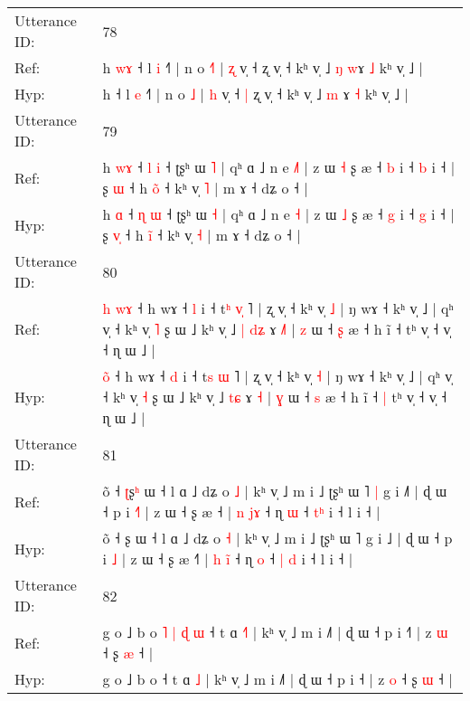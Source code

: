 \documentclass[10pt]{article}
\DeclareRobustCommand{\hl}[1]{{\textcolor{red}{#1}}}
\begin{document}
\begin{longtable}{ll}
 \\
\midrule
Utterance ID: & 78 \\
Ref: & h\hl{ }\hl{w}\hl{ɤ} ˧ l \hl{i} ˧˥ | n o \hl{˧}\hl{˥} | \hl{ʐ} v̩ ˧\hl{}\hl{} ʐ v̩ ˧ kʰ v̩ ˩ \hl{ŋ} \hl{w}ɤ \hl{˩} kʰ v̩ ˩ |
 \\
Hyp: & h\hl{}\hl{}\hl{} ˧ l \hl{e} ˧˥ | n o \hl{}\hl{˩} | \hl{h} v̩ ˧\hl{ }\hl{|} ʐ v̩ ˧ kʰ v̩ ˩ \hl{m} \hl{}ɤ \hl{˧} kʰ v̩ ˩ |
 \\
\midrule
Utterance ID: & 79 \\
Ref: & h \hl{w}\hl{ɤ} ˧ \hl{l} \hl{i} ˧ ʈʂʰ ɯ \hl{˥} | qʰ ɑ ˩ n e \hl{˩}\hl{˥} | z ɯ \hl{˧} ʂ æ ˧ \hl{b} i ˧ \hl{b} i ˧ | ʂ \hl{}\hl{ɯ} ˧ h \hl{o}̃ ˧ kʰ v̩ \hl{˥} | m ɤ ˧ dʑ o ˧ |
 \\
Hyp: & h \hl{}\hl{ɑ} ˧ \hl{ɳ} \hl{ɯ} ˧ ʈʂʰ ɯ \hl{˧} | qʰ ɑ ˩ n e \hl{}\hl{˧} | z ɯ \hl{˩} ʂ æ ˧ \hl{g} i ˧ \hl{g} i ˧ | ʂ \hl{v}\hl{̩} ˧ h \hl{i}̃ ˧ kʰ v̩ \hl{˧} | m ɤ ˧ dʑ o ˧ |
 \\
\midrule
Utterance ID: & 80 \\
Ref: & \hl{h}\hl{ }\hl{w}\hl{ɤ} ˧ h wɤ ˧ \hl{l} i ˧ t\hl{ʰ} \hl{v}\hl{̩} ˥ | ʐ v̩ ˧ kʰ v̩ \hl{˩} | ŋ wɤ ˧ kʰ v̩ ˩ | qʰ v̩ ˧ kʰ v̩ \hl{˥} ʂ ɯ ˩ kʰ v̩ ˩\hl{ }\hl{|} \hl{d}\hl{ʑ} ɤ \hl{˩}\hl{˥} | \hl{z} ɯ ˧ \hl{ʂ} æ ˧ h ĩ ˧\hl{}\hl{} tʰ v̩ ˧ v̩ ˧ ɳ ɯ ˩ |
 \\
Hyp: & \hl{}\hl{}\hl{o}\hl{̃} ˧ h wɤ ˧ \hl{d} i ˧ t\hl{s} \hl{}\hl{ɯ} ˥ | ʐ v̩ ˧ kʰ v̩ \hl{˧} | ŋ wɤ ˧ kʰ v̩ ˩ | qʰ v̩ ˧ kʰ v̩ \hl{˧} ʂ ɯ ˩ kʰ v̩ ˩\hl{}\hl{} \hl{t}\hl{ɕ} ɤ \hl{}\hl{˧} | \hl{ɣ} ɯ ˧ \hl{s} æ ˧ h ĩ ˧\hl{ }\hl{|} tʰ v̩ ˧ v̩ ˧ ɳ ɯ ˩ |
 \\
\midrule
Utterance ID: & 81 \\
Ref: & õ ˧ \hl{ʈ}ʂ\hl{ʰ} ɯ ˧ l ɑ ˩ dʑ o \hl{˩} | kʰ v̩ ˩ m i ˩ ʈʂʰ ɯ ˥\hl{ }\hl{|} g i ˩\hl{˥} | ɖ ɯ ˧ p i \hl{˧}\hl{˥} | z ɯ ˧ ʂ æ ˧\hl{} | \hl{n} \hl{j}\hl{ɤ} ˧ ɳ \hl{ɯ} ˧ \hl{}\hl{t}\hl{ʰ} i ˧ l i ˧ |
 \\
Hyp: & õ ˧ \hl{}ʂ\hl{} ɯ ˧ l ɑ ˩ dʑ o \hl{˧} | kʰ v̩ ˩ m i ˩ ʈʂʰ ɯ ˥\hl{}\hl{} g i ˩\hl{} | ɖ ɯ ˧ p i \hl{}\hl{˩} | z ɯ ˧ ʂ æ ˧\hl{˥} | \hl{h} \hl{i}\hl{̃} ˧ ɳ \hl{o} ˧ \hl{|}\hl{ }\hl{d} i ˧ l i ˧ |
 \\
\midrule
Utterance ID: & 82 \\
Ref: & g o ˩ b o\hl{ }\hl{˥}\hl{ }\hl{|}\hl{ }\hl{ɖ}\hl{ }\hl{ɯ} ˧ t ɑ \hl{˧}\hl{˥} | kʰ v̩ ˩ m i ˩˥ | ɖ ɯ ˧ p i ˧\hl{˥} | z \hl{ɯ} ˧ ʂ \hl{æ} ˧ |
 \\
Hyp: & g o ˩ b o\hl{}\hl{}\hl{}\hl{}\hl{}\hl{}\hl{}\hl{} ˧ t ɑ \hl{}\hl{˩} | kʰ v̩ ˩ m i ˩˥ | ɖ ɯ ˧ p i ˧\hl{} | z \hl{o} ˧ ʂ \hl{ɯ} ˧ |

\end{longtable}
\end{document}
